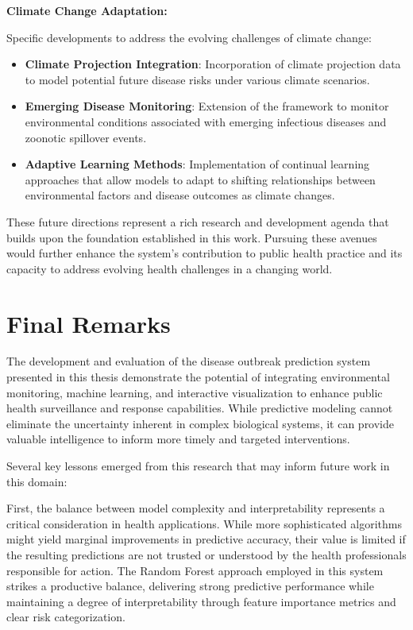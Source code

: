 \documentclass[12pt,a4paper]{report}
\begin{document}
\textbf{Climate Change Adaptation:}

Specific developments to address the evolving challenges of climate change:

\begin{itemize}
    \item \textbf{Climate Projection Integration}: Incorporation of climate projection data to model potential future disease risks under various climate scenarios.
    
    \item \textbf{Emerging Disease Monitoring}: Extension of the framework to monitor environmental conditions associated with emerging infectious diseases and zoonotic spillover events.
    
    \item \textbf{Adaptive Learning Methods}: Implementation of continual learning approaches that allow models to adapt to shifting relationships between environmental factors and disease outcomes as climate changes.
\end{itemize}

These future directions represent a rich research and development agenda that builds upon the foundation established in this work. Pursuing these avenues would further enhance the system's contribution to public health practice and its capacity to address evolving health challenges in a changing world.

\section{Final Remarks}
The development and evaluation of the disease outbreak prediction system presented in this thesis demonstrate the potential of integrating environmental monitoring, machine learning, and interactive visualization to enhance public health surveillance and response capabilities. While predictive modeling cannot eliminate the uncertainty inherent in complex biological systems, it can provide valuable intelligence to inform more timely and targeted interventions.

Several key lessons emerged from this research that may inform future work in this domain:

First, the balance between model complexity and interpretability represents a critical consideration in health applications. While more sophisticated algorithms might yield marginal improvements in predictive accuracy, their value is limited if the resulting predictions are not trusted or understood by the health professionals responsible for action. The Random Forest approach employed in this system strikes a productive balance, delivering strong predictive performance while maintaining a degree of interpretability through feature importance metrics and clear risk categorization.
\end{document}
